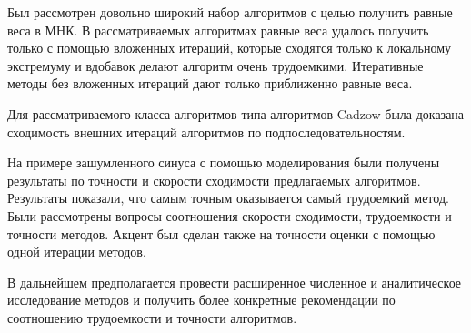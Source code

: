 \documentclass[12pt,a4paper,fleqn,leqno]{article}
\begin{document}
Был рассмотрен довольно широкий набор алгоритмов с целью получить равные веса в МНК. В рассматриваемых алгоритмах равные веса удалось
получить только с помощью вложенных итераций, которые сходятся только к локальному экстремуму и вдобавок делают алгоритм очень трудоемкими.
Итеративные методы без вложенных итераций дают только приближенно равные веса.

Для рассматриваемого класса алгоритмов типа алгоритмов Cadzow была доказана сходимость внешних итераций алгоритмов по подпоследовательностям.

На примере зашумленного синуса с помощью моделирования были получены результаты по точности и скорости сходимости предлагаемых алгоритмов.
Результаты показали, что самым точным оказывается самый трудоемкий метод.
Были рассмотрены вопросы соотношения скорости сходимости, трудоемкости и точности методов.
Акцент был сделан также на точности оценки с помощью одной итерации методов.

В дальнейшем предполагается провести расширенное численное и аналитическое исследование методов и получить более конкретные рекомендации по
соотношению трудоемкости и точности алгоритмов.
\end{document}
